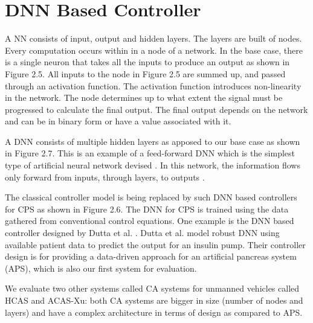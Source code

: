 \section{DNN Based Controller}
\label{apsdnn}


A \ac{NN} consists of input, output and hidden layers. 
The layers are built of nodes. Every computation occurs within in a node of a network.
In the base case, there is a single neuron that takes all the inputs to produce an output as shown in Figure 2.5. 
All inputs to the node in Figure 2.5 are summed up, and  passed through an activation function. 
The activation function introduces non-linearity in the network. 
The node determines up to what extent the signal must be progressed  to calculate the final output. 
The final output depends on the network and can be in binary form or have a value associated with it. 


A \ac{DNN} consists of multiple hidden layers as apposed to our base case  as shown in Figure 2.7.
This is an example of a feed-forward \ac{DNN} which is the simplest type of artificial neural network devised \cite{feedforward}.
In this network, the information flows only forward from inputs, through layers, to outputs \cite{Zell}. 

The classical controller model is being replaced by such DNN based controllers for CPS as shown in  Figure 2.6.
The \ac{DNN} for \ac*{CPS} is trained using the data gathered from conventional control equations. 
One example is the DNN based controller designed by Dutta et al. \cite{Dutta_Others__2018__Robust}. 
Dutta et al. model robust DNN using available patient data to predict the output for an insulin pump.
Their controller design is for providing a data-driven approach for an artificial pancreas system (APS), which is also our first system for evaluation. 

We evaluate two other systems called \ac{CA} systems for unmanned vehicles \cite{7778055} called \ac{HCAS} and \ac{ACAS-Xu}: both \ac{CA} systems are bigger in size (number of nodes and layers) and have a complex architecture in terms of design as compared to \ac{APS}.


